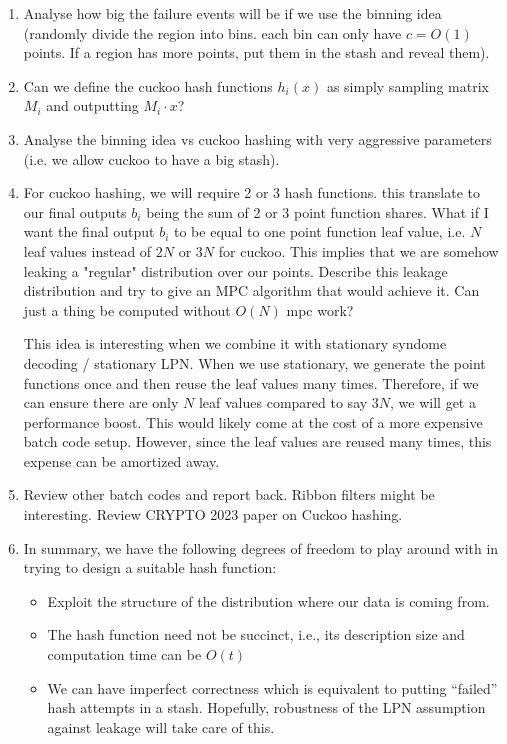 \begin{enumerate}
  \item Analyse how big the failure events will be if we use the binning idea (randomly divide the region into bins. each bin can only have $c=O(1)$ points. If a region has more points, put them in the stash and reveal them).

  \item Can we define the cuckoo hash functions $h_i(x)$ as simply sampling matrix $M_i$ and outputting $M_i\cdot x$?

  \item Analyse the binning idea vs cuckoo hashing with very aggressive parameters (i.e. we allow cuckoo to have a big stash).

  \item For cuckoo hashing, we will require 2 or 3 hash functions. this translate to our final outputs $b_i$ being the sum of 2 or 3 point function shares. What if I want the final output $b_i$ to be equal to one point function leaf value, i.e. $N$ leaf values instead of $2N$ or $3N$ for cuckoo. This implies that we are somehow leaking a "regular" distribution over our points. Describe this leakage distribution and try to give an MPC algorithm that would achieve it. Can just a thing be computed without $O(N)$ mpc work?

    This idea is interesting when we combine it with stationary syndome decoding  / stationary LPN. When we use stationary, we generate the point functions once and then reuse the leaf values many times. Therefore, if we can ensure there are only $N$ leaf values compared to say $3N$, we will get a performance boost. This would likely come at the cost of a more expensive batch code setup. However, since the leaf values are reused many times, this expense can be amortized away.

  \item Review other batch codes and report back. Ribbon filters might be interesting. Review CRYPTO 2023 paper on Cuckoo hashing.

  \item In summary, we have the following degrees of freedom to play around with in trying to design a suitable hash function:

    \begin{itemize}
      \item Exploit the structure of the distribution where our data is coming from.

      \item The hash function need not be succinct, i.e., its description size and computation time can be $O(t)$

      \item We can have imperfect correctness which is equivalent to putting ``failed'' hash attempts in a stash. Hopefully, robustness of the LPN assumption against leakage will take care of this.
    \end{itemize}

\end{enumerate}

